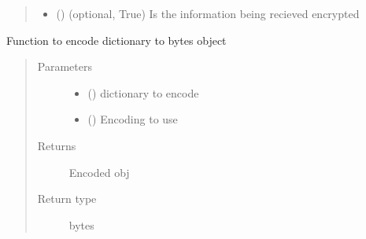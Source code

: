 \documentclass[letterpaper,10pt,english]{sphinxmanual}
\begin{document}
\begin{fulllineitems}
\begin{fulllineitems}
\begin{quote}
\begin{description}
\begin{itemize}
\item {} 
 () \textendash{} (optional, True) Is the information being recieved encrypted

\end{itemize}

\end{description}\end{quote}

\end{fulllineitems}


\begin{fulllineitems}
\label{\detokenize{Message:Message.Message._json_encode}}
Function to encode dictionary to bytes object
\begin{quote}\begin{description}
\item[{Parameters}] \leavevmode\begin{itemize}
\item {} 
 () \textendash{} dictionary to encode

\item {} 
 () \textendash{} Encoding to use

\end{itemize}

\item[{Returns}] \leavevmode
Encoded obj

\item[{Return type}] \leavevmode
bytes

\end{description}\end{quote}

\end{fulllineitems}



\end{fulllineitems}
\end{document}
